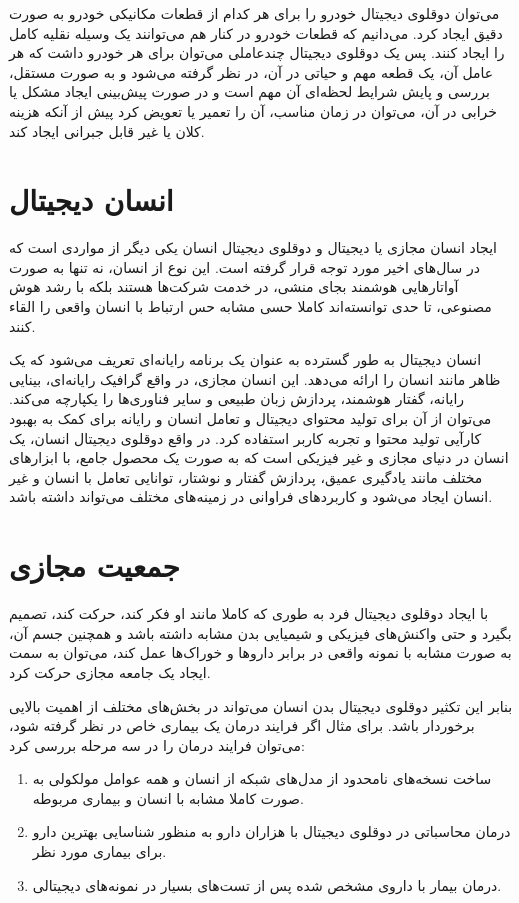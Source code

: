 می‌توان دوقلوی دیجیتال خودرو را برای هر کدام از قطعات مکانیکی خودرو به صورت دقیق ایجاد کرد. می‌دانیم که قطعات خودرو در کنار هم می‌توانند یک وسیله نقلیه کامل را ایجاد کنند. پس یک دوقلوی دیجیتال چندعاملی می‌توان برای هر خودرو داشت که هر عامل آن، یک قطعه مهم و حیاتی در آن، در نظر گرفته می‌شود و به صورت مستقل، بررسی و پایش شرایط لحظه‌ای آن مهم است و در صورت پیش‌بینی ایجاد مشکل یا خرابی در آن، می‌توان در زمان مناسب، آن را تعمیر یا تعویض کرد پیش از آنکه هزینه کلان یا غیر قابل جبرانی ایجاد کند.

\section{انسان دیجیتال}
ایجاد انسان مجازی یا دیجیتال و دوقلوی دیجیتال انسان 
یکی دیگر از مواردی است که در سال‌های اخیر مورد توجه قرار گرفته است. این نوع از انسان، نه تنها به صورت آواتارهایی هوشمند بجای منشی، در خدمت شرکت‌ها هستند بلکه با رشد هوش مصنوعی، تا حدی توانسته‌اند کاملا حسی مشابه حس ارتباط با انسان واقعی را القاء کنند.

انسان دیجیتال به طور گسترده به عنوان یک برنامه رایانه‌ای تعریف می‌شود که یک ظاهر مانند انسان را ارائه می‌دهد. این انسان مجازی، در واقع گرافیک رایانه‌ای، بینایی رایانه، گفتار هوشمند، پردازش زبان طبیعی و سایر فناوری‌ها را یکپارچه می‌کند. می‌توان از آن برای تولید محتوای دیجیتال و تعامل انسان و رایانه برای کمک به بهبود کارآیی تولید محتوا و تجربه کاربر استفاده کرد. در واقع دوقلوی دیجیتال انسان، یک انسان در دنیای مجازی و غیر فیزیکی است که به صورت یک محصول جامع، با ابزار‌های مختلف مانند یادگیری عمیق،‌ پردازش گفتار و نوشتار، توانایی تعامل با انسان و غیر انسان ایجاد می‌شود و کاربرد‌های فراوانی در زمینه‌های مختلف می‌تواند داشته باشد.

\section{جمعیت مجازی}
با ایجاد دوقلوی دیجیتال فرد به طوری که کاملا مانند او فکر کند، حرکت کند، تصمیم بگیرد و حتی واکنش‌های فیزیکی و شیمیایی بدن مشابه داشته باشد و همچنین جسم آن، به صورت مشابه با نمونه واقعی در برابر دارو‌ها و خوراک‌ها عمل کند، می‌توان به سمت ایجاد یک جامعه مجازی حرکت کرد.

بنابر این تکثیر دوقلوی دیجیتال بدن انسان می‌تواند در بخش‌های مختلف از اهمیت بالایی برخوردار باشد. برای مثال اگر فرایند درمان یک بیماری خاص در نظر گرفته شود، می‌توان فرایند درمان را در سه مرحله بررسی کرد:
\begin{enumerate}
	\item 
ساخت نسخه‌های نامحدود از مدل‌های شبکه از انسان و همه عوامل مولکولی به صورت کاملا مشابه با انسان و بیماری مربوطه.
	\item 
درمان محاسباتی در دوقلوی دیجیتال با هزاران دارو به منظور شناسایی بهترین دارو برای بیماری مورد نظر.
	\item 
درمان بیمار با داروی مشخص شده پس از تست‌های بسیار در نمونه‌های دیجیتالی.
\end{enumerate}

